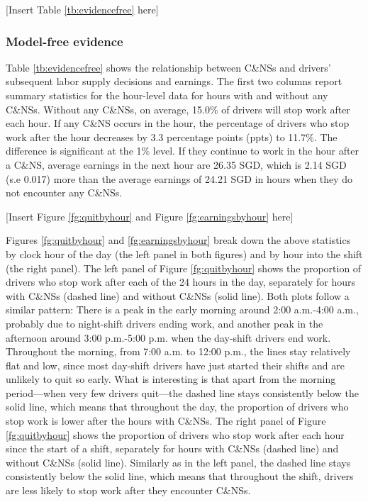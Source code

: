 \documentclass[reviewmode]{AEA}
\begin{document}
\begin{center}
	[Insert Table \ref{tb:evidencefree} here]
\end{center}

\subsubsection{Model-free evidence}
Table \ref{tb:evidencefree} shows the relationship between C\&NSs and drivers' subsequent labor supply decisions and earnings. The first two columns report summary statistics for the hour-level data for hours with and without any C\&NSs. Without any C\&NSs, on average, 15.0\% of drivers will stop work after each hour.
If any C\&NS occurs in the hour, the percentage of drivers who stop work after the hour decreases by 3.3 percentage points (ppts) to 11.7\%. The difference is significant at the 1\% level. If they continue to work in the hour after a C\&NS, average earnings in the next hour are 26.35 SGD, which is 2.14 SGD (s.e 0.017) more than the average earnings of 24.21 SGD in hours when they do not encounter any C\&NSs. 
\begin{center}
	[Insert Figure \ref{fg:quitbyhour} and Figure \ref{fg:earningsbyhour} here]
\end{center}


Figures \ref{fg:quitbyhour} and \ref{fg:earningsbyhour} break down the above  statistics by clock hour of the day (the left panel in both figures) and by hour into the shift (the right panel). The left panel of Figure \ref{fg:quitbyhour} shows the proportion of drivers who stop work after each of the 24 hours in the day, separately for hours with C\&NSs (dashed line) and without C\&NSs (solid line). Both plots follow a similar pattern: There is a peak in the early morning around 2:00 a.m.-4:00 a.m., probably due to night-shift drivers ending work, and another peak in the afternoon around 3:00 p.m.-5:00 p.m. when the day-shift drivers end work. Throughout the morning, from 7:00 a.m. to 12:00 p.m., the lines stay relatively flat and low, since most day-shift drivers have just started their shifts and are unlikely to quit so early. What is interesting is that apart from the morning period---when very few drivers quit---the dashed line stays consistently below the solid line, which means that throughout  the day, the proportion of drivers who stop work is lower after the hours with C\&NSs. The right panel of Figure \ref{fg:quitbyhour} shows the proportion of drivers who stop work after each hour since the start of a shift, separately for hours with C\&NSs (dashed line) and without C\&NSs (solid line). Similarly as in the left panel, the dashed line stays consistently below the solid line, which means that throughout the shift, drivers are less likely to stop work after they encounter C\&NSs.
\end{document}
